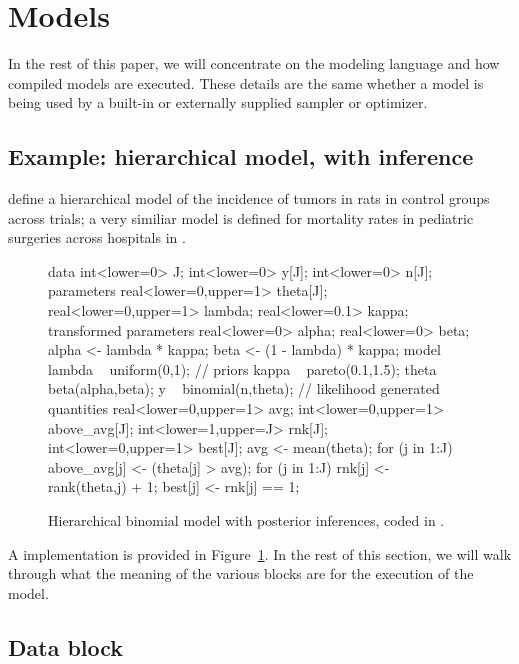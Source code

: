 \documentclass[article]{jss}
\begin{document}
\section{Models}

In the rest of this paper, we will concentrate on the modeling
language and how compiled models are executed.  These details are the
same whether a  model is being used by a built-in or
externally supplied sampler or optimizer.

\subsection{Example: hierarchical model, with inference}

\cite[Section 5.1]{GelmanEtAl:2013} define a hierarchical model of the
incidence of tumors in rats in control groups across trials; a very
similiar model is defined for mortality rates in pediatric surgeries
across hospitals in \citep[Examples, Volume 1]{LunnEtAl:2000,LunnEtAl:2009}.%


\begin{figure}
\begin{Code}
data {
  int<lower=0> J;
  int<lower=0> y[J];
  int<lower=0> n[J];
}
parameters {
  real<lower=0,upper=1> theta[J];
  real<lower=0,upper=1> lambda;
  real<lower=0.1> kappa;
}
transformed parameters {
  real<lower=0> alpha;
  real<lower=0> beta;
  alpha <- lambda * kappa;
  beta <- (1 - lambda) * kappa;
}
model {
  lambda ~ uniform(0,1);     // priors
  kappa ~ pareto(0.1,1.5);
  theta ~ beta(alpha,beta);
  y ~ binomial(n,theta);     // likelihood
}
generated quantities {
  real<lower=0,upper=1> avg;
  int<lower=0,upper=1> above_avg[J];
  int<lower=1,upper=J> rnk[J];
  int<lower=0,upper=1> best[J];
  avg <- mean(theta);
  for (j in 1:J)
    above_avg[j] <- (theta[j] > avg);
  for (j in 1:J) {
    rnk[j] <- rank(theta,j) + 1;
    best[j] <- rnk[j] == 1;
  }
}
\end{Code}
  \caption{Hierarchical binomial model with posterior inferences,
    coded in .}\label{hier-binom.fig}
\end{figure}
%
A  implementation is provided in
Figure~\ref{hier-binom.fig}.  In the rest of this section, we will
walk through what the meaning of the various blocks are for the
execution of the model.

\subsection{Data block}
\end{document}
